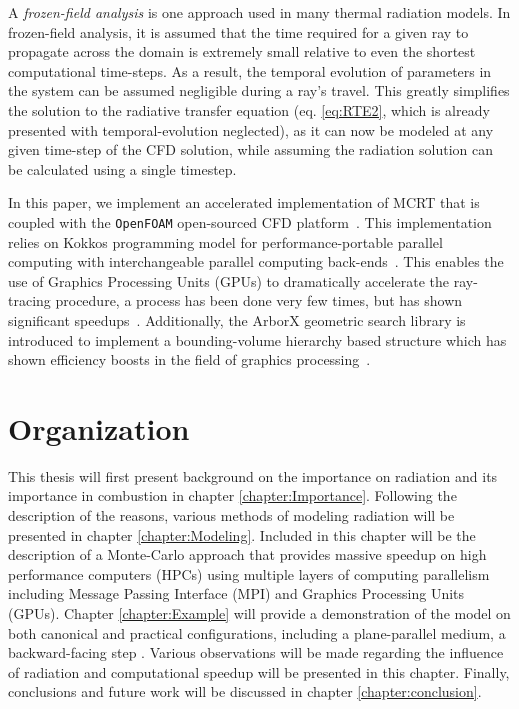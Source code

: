 A \textit{frozen-field analysis} is one approach used in many thermal radiation models. In frozen-field analysis, it is assumed that the time required for a given ray to propagate across the domain is extremely small relative to even the shortest computational time-steps. 
As a result, the temporal evolution of parameters in the system can be assumed negligible during a ray's travel.
This greatly simplifies the solution to the radiative transfer equation (eq. \ref{eq:RTE2}, which is already presented with temporal-evolution neglected), as it can now be modeled at any given time-step of the CFD solution, while assuming the radiation solution can be calculated using a single timestep.

In this paper, we implement an accelerated implementation of MCRT that is coupled with the \verb|OpenFOAM| open-sourced CFD platform~\cite{Weller1998ATechniques}. 
This implementation relies on Kokkos programming model for performance-portable parallel computing with interchangeable parallel computing back-ends~\cite{Trott2021KokkosEra}. This enables the use of Graphics Processing Units (GPUs) to dramatically accelerate the ray-tracing procedure, a process has been done very few times, but has shown significant speedups~\cite{Silvestri2019ASimulation,Humphrey2016RadiativeRefinement,Heymann2012GPU-basedAGN}. 
Additionally, the ArborX geometric search library is introduced to implement a bounding-volume hierarchy based structure which has shown efficiency boosts in the field of graphics processing~\cite{Lebrun-Grandie2019ArborX:Library}. 

\section{Organization}
This thesis will first present background on the importance on radiation and its importance in combustion in chapter \ref{chapter:Importance}. 
Following the description of the reasons, various methods of modeling radiation will be presented in chapter \ref{chapter:Modeling}. Included in this chapter will be the description of a Monte-Carlo approach that provides massive speedup on high performance computers (HPCs) using multiple layers of computing parallelism including Message Passing Interface (MPI) and Graphics Processing Units (GPUs).
Chapter \ref{chapter:Example} will provide a demonstration of the model on both canonical and practical configurations, including a plane-parallel medium, a backward-facing step . Various observations will be made regarding the influence of radiation and computational speedup will be presented in this chapter.
Finally, conclusions and future work will be discussed in chapter \ref{chapter:conclusion}.